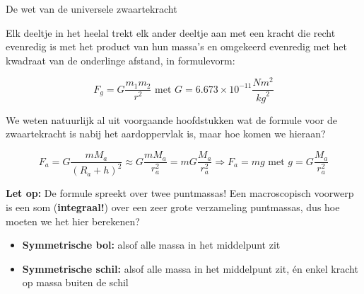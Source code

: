\begin{theo}{De wet van de universele zwaartekracht}

Elk deeltje in het heelal trekt elk ander deeltje aan met een kracht die recht evenredig is met het product van hun massa’s en omgekeerd evenredig met het kwadraat van de onderlinge afstand, in formulevorm:
 
 \begin{equation*}
     F_g = G\dfrac{m_1m_2}{r^2} \text{ met } G = 6.673 \times 10^{-11} \dfrac{Nm^2}{{kg}^2}
 \end{equation*}
 
\noindent We weten natuurlijk al uit voorgaande hoofdstukken wat de formule voor de zwaartekracht is nabij het aardoppervlak is, maar hoe komen we hieraan?

\begin{equation*}
    F_a = G\dfrac{mM_a}{(R_a+h)^2} \approx G\dfrac{mM_a}{r_a^2} = mG\dfrac{M_a}{r_a^2} \Rightarrow F_a = mg \text{ met } g = G\dfrac{M_a}{r_a^2}
\end{equation*}



\noindent \textbf{Let op:} De formule spreekt over twee puntmassas! Een macroscopisch voorwerp is een som (\textbf{integraal!}) over een zeer grote verzameling puntmassas, dus hoe moeten we het hier berekenen?
\begin{itemize}
    \item \textbf{Symmetrische bol:} alsof alle massa in het middelpunt zit
    \item \textbf{Symmetrische schil:} alsof alle massa in het middelpunt zit, én enkel kracht op massa buiten de schil
\end{itemize}

\end{theo}


